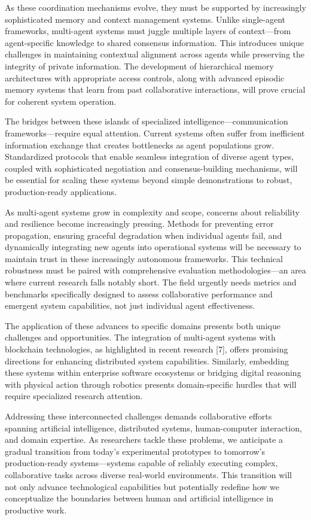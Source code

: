 \documentclass[journal,twoside,10pt]{IEEEtran}
\begin{document}
As these coordination mechanisms evolve, they must be supported by increasingly sophisticated memory and context management systems. Unlike single-agent frameworks, multi-agent systems must juggle multiple layers of context—from agent-specific knowledge to shared consensus information. This introduces unique challenges in maintaining contextual alignment across agents while preserving the integrity of private information. The development of hierarchical memory architectures with appropriate access controls, along with advanced episodic memory systems that learn from past collaborative interactions, will prove crucial for coherent system operation.

The bridges between these islands of specialized intelligence—communication frameworks—require equal attention. Current systems often suffer from inefficient information exchange that creates bottlenecks as agent populations grow. Standardized protocols that enable seamless integration of diverse agent types, coupled with sophisticated negotiation and consensus-building mechanisms, will be essential for scaling these systems beyond simple demonstrations to robust, production-ready applications.

As multi-agent systems grow in complexity and scope, concerns about reliability and resilience become increasingly pressing. Methods for preventing error propagation, ensuring graceful degradation when individual agents fail, and dynamically integrating new agents into operational systems will be necessary to maintain trust in these increasingly autonomous frameworks. This technical robustness must be paired with comprehensive evaluation methodologies—an area where current research falls notably short. The field urgently needs metrics and benchmarks specifically designed to assess collaborative performance and emergent system capabilities, not just individual agent effectiveness.

The application of these advances to specific domains presents both unique challenges and opportunities. The integration of multi-agent systems with blockchain technologies, as highlighted in recent research [7], offers promising directions for enhancing distributed system capabilities. Similarly, embedding these systems within enterprise software ecosystems or bridging digital reasoning with physical action through robotics presents domain-specific hurdles that will require specialized research attention.

Addressing these interconnected challenges demands collaborative efforts spanning artificial intelligence, distributed systems, human-computer interaction, and domain expertise. As researchers tackle these problems, we anticipate a gradual transition from today's experimental prototypes to tomorrow's production-ready systems—systems capable of reliably executing complex, collaborative tasks across diverse real-world environments. This transition will not only advance technological capabilities but potentially redefine how we conceptualize the boundaries between human and artificial intelligence in productive work.
\end{document}
